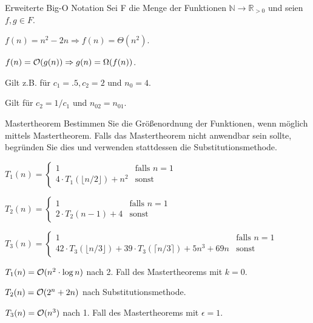 \documentclass{article}
\begin{document}
\begin{eexercises}{Erweiterte Big-O Notation}{
    Sei F die Menge der Funktionen $\mathbb{N} \rightarrow \mathbb{R}_{>0}$ und seien $f, g \in F$.
  }
  \item $f(n)=n^2-2n \Rightarrow f(n)=\Theta(n^2)$.
  \item $f(n)=\mathcal{O}(g(n)) \Rightarrow g(n)=\Omega(f(n))$.
\end{eexercises}

\begin{solutions}
  \item Gilt z.B. für $c_1=.5, c_2=2$ und $n_0=4$.
  \item Gilt für $c_2=1/c_1$ und $n_{02}=n_{01}$.
\end{solutions}

\begin{eexercises}{Mastertheorem}{
    Bestimmen Sie die Größenordnung der Funktionen, wenn möglich mittels Mastertheorem. Falls das Mastertheorem nicht anwendbar sein sollte, begründen Sie dies und verwenden stattdessen die Substitutionsmethode.
  }
  \item $T_1(n) = \begin{cases}
      1                                      & \text{falls } n = 1 \\
      4 \cdot T_1(\lfloor n/2 \rfloor) + n^2 & \text{sonst}
    \end{cases}$
  \item $T_2(n) = \begin{cases}
      1                    & \text{falls } n = 1 \\
      2 \cdot T_2(n-1) + 4 & \text{sonst}
    \end{cases}$
  \item $T_3(n) = \begin{cases}
      1                                                                                & \text{falls } n = 1 \\
      42 \cdot T_3(\lfloor n/3 \rfloor) + 39 \cdot T_3(\lceil n/3 \rceil) + 5n^3 + 69n & \text{sonst}
    \end{cases}$
\end{eexercises}

\begin{solutions}
  \item $T_1(n) = \mathcal{O}(n^2\cdot \log{n})$ nach 2. Fall des Mastertheorems mit $k=0$.
  \item $T_2(n) = \mathcal{O}(2^n+2n)$ nach Substitutionsmethode.
  \item $T_3(n) = \mathcal{O}(n^3)$ nach 1. Fall des Mastertheorems mit $\epsilon=1$.
\end{solutions}
\end{document}
